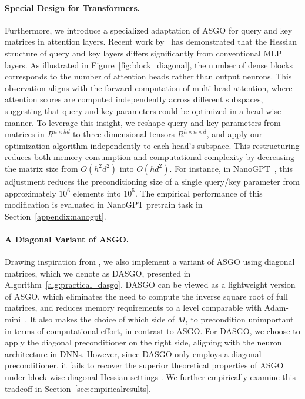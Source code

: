 \documentclass{article}
\theoremstyle{remark}
\begin{document}
\paragraph{Special Design for Transformers.} Furthermore, we introduce a specialized adaptation of ASGO for query and key matrices in attention layers. Recent work by~\citet{zhang2024adam} has demonstrated that the Hessian structure of query and key layers differs significantly from conventional MLP layers. As illustrated in Figure~\ref{fig:block_diagonal}, the number of dense blocks corresponds to the number of attention heads rather than output neurons. This observation aligns with the forward computation of multi-head attention, where attention scores are computed independently across different subspaces, suggesting that query and key parameters could be optimized in a head-wise manner. To leverage this insight, we reshape query and key parameters from matrices in $R^{n \times h d}$ to three-dimensional tensors $R^{h \times n \times d}$, and apply our optimization algorithm independently to each head's subspace. This restructuring reduces both memory consumption and computational complexity by decreasing the matrix size from $O(h^2d^2)$ into $O(h d^2)$. For instance, in NanoGPT~\citep{Karpathy2022}, this adjustment reduces the preconditioning size of a single query/key parameter from approximately $10^6$ elements into $10^5$. The empirical performance of this modification is evaluated in NanoGPT pretrain task in Section~\ref{appendix:nanogpt}.

\paragraph{A Diagonal Variant of ASGO.} Drawing inspiration from \citet{duchi2011adaptive} , we also implement a variant of ASGO using diagonal matrices, which we denote as DASGO, presented in Algorithm~\ref{alg:practical_dasgo}. DASGO can be viewed as a lightweight version of ASGO, which eliminates the need to compute the inverse square root of full matrices, and reduces memory requirements to a level comparable with Adam-mini~\citep{zhang2024adam}. It also makes the choice of which side of $M_t$ to precondition unimportant in terms of computational effort, in contrast to ASGO. For DASGO, we choose to apply the diagonal preconditioner on the right side, aligning with the neuron architecture in DNNs. However, since DASGO only employs a diagonal preconditioner, it fails to recover the superior theoretical properties of ASGO under block-wise diagonal Hessian settings . We further empirically examine this tradeoff in Section~\ref{sec:empiricalresults}.
\end{document}
